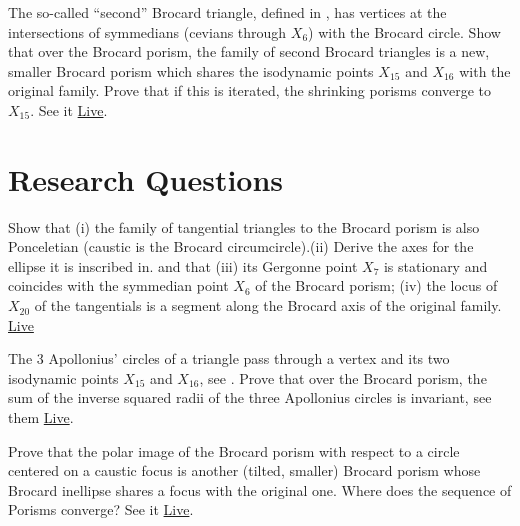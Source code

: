 \begin{exercise}
The so-called ``second'' Brocard triangle, defined in \cite[Second Brocard Triangle]{mw}, has vertices at the intersections of symmedians (cevians through $X_6$) with the Brocard circle. Show that over the Brocard porism, the family of second Brocard triangles is a new, smaller Brocard porism which shares the isodynamic points $X_{15}$ and $X_{16}$ with the original family. Prove that if this is iterated, the shrinking porisms converge to $X_{15}$. See it \href{https://bit.ly/3ttMNBg}{Live}.
\end{exercise}

\section{Research Questions}

\begin{question}
Show that (i) the family of tangential triangles to the Brocard porism is also Ponceletian (caustic is the Brocard circumcircle).(ii) Derive the axes for the ellipse it is inscribed in.  and that (iii) its Gergonne point $X_7$ is stationary and coincides with the symmedian point $X_6$ of the Brocard porism; (iv) the locus of $X_{20}$ of the tangentials is a segment along the Brocard axis of the original family. \href{https://bit.ly/2RpNxdn}{Live} 
\end{question}

\begin{question}
The 3 Apollonius' circles of a triangle pass through a vertex and its two isodynamic points $X_{15}$ and $X_{16}$, see \cite[Isodynamic points]{mw}. Prove that over the Brocard porism, the sum of the inverse squared radii of the three Apollonius circles is invariant, see them \href{https://bit.ly/3elEzXI}{Live}.
\end{question}

\begin{question}
Prove that the polar image of the Brocard porism with respect to a circle centered on a caustic focus is another (tilted, smaller) Brocard porism whose Brocard inellipse shares a focus with the original one. Where does the sequence of Porisms converge? See it \href{https://bit.ly/3b7erOg}{Live}.
\end{question}
